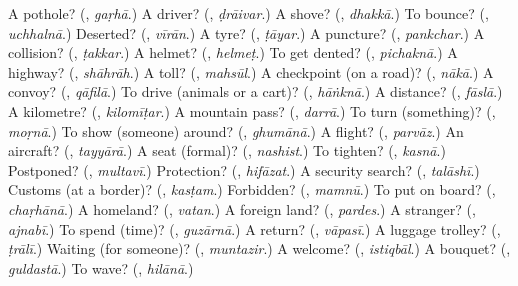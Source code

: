 \begin{tcolorbox}[breakable,colback=teal!4,colframe=teal!35!black,title={Before you move on}]
A pothole? (\textbf{}, \emph{gaṛhā}.) A driver? (\textbf{}, \emph{ḍrāivar}.) A shove? (\textbf{}, \emph{dhakkā}.) To bounce? (\textbf{}, \emph{uchhalnā}.) Deserted? (\textbf{}, \emph{vīrān}.) A tyre? (\textbf{}, \emph{ṭāyar}.) A puncture? (\textbf{}, \emph{pankchar}.) A collision? (\textbf{}, \emph{ṭakkar}.) A helmet? (\textbf{}, \emph{helmeṭ}.) To get dented? (\textbf{}, \emph{pichaknā}.) A highway? (\textbf{}, \emph{shāhrāh}.) A toll? (\textbf{}, \emph{mahsūl}.) A checkpoint (on a road)? (\textbf{}, \emph{nākā}.) A convoy? (\textbf{}, \emph{qāfilā}.) To drive (animals or a cart)? (\textbf{}, \emph{hāṅknā}.) A distance? (\textbf{}, \emph{fāslā}.) A kilometre? (\textbf{}, \emph{kilomīṭar}.) A mountain pass? (\textbf{}, \emph{darrā}.) To turn (something)? (\textbf{}, \emph{moṛnā}.) To show (someone) around? (\textbf{}, \emph{ghumānā}.) A flight? (\textbf{}, \emph{parvāz}.) An aircraft? (\textbf{}, \emph{tayyārā}.) A seat (formal)? (\textbf{}, \emph{nashist}.) To tighten? (\textbf{}, \emph{kasnā}.) Postponed? (\textbf{}, \emph{multavī}.) Protection? (\textbf{}, \emph{hifāzat}.) A security search? (\textbf{}, \emph{talāshī}.) Customs (at a border)? (\textbf{}, \emph{kasṭam}.) Forbidden? (\textbf{}, \emph{mamnū}.) To put on board? (\textbf{}, \emph{chaṛhānā}.) A homeland? (\textbf{}, \emph{vatan}.) A foreign land? (\textbf{}, \emph{pardes}.) A stranger? (\textbf{}, \emph{ajnabī}.) To spend (time)? (\textbf{}, \emph{guzārnā}.) A return? (\textbf{}, \emph{vāpasī}.) A luggage trolley? (\textbf{}, \emph{ṭrālī}.) Waiting (for someone)? (\textbf{}, \emph{muntazir}.) A welcome? (\textbf{}, \emph{istiqbāl}.) A bouquet? (\textbf{}, \emph{guldastā}.) To wave? (\textbf{}, \emph{hilānā}.)
\end{tcolorbox}
